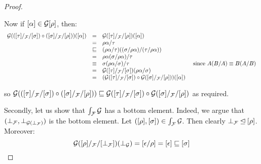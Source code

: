 \begin{proof}
\begin{enumerate}
\[  \]
  Now if ${[\alpha]} \in \mathcal{G}{{[\rho]}}$, then:
  \[
    \begin{array}{rcll}
    \mathcal{G}(({[\tau]}/_{\mathcal{F}}/{[\sigma]}) \circ ({[\sigma]}/_{\mathcal{F}}/{[\rho]}))({[\alpha]})
    & = & \mathcal{G}({[\tau]}/_{\mathcal{F}}/{[\rho]})({[\alpha]}) \\
    & = & \rho\alpha/\tau \\
    & \sqsubseteq & (\rho\alpha/\tau)((\sigma/\rho\alpha)/(\tau/\rho\alpha)) \\
    & = & \rho\alpha(\sigma/\rho\alpha)/\tau \\
    & \equiv & \sigma(\rho\alpha/\sigma)/\tau & \text{ since $A(B/A) \equiv B(A/B)$} \\
    & = & \mathcal{G}({[\tau]}/_{\mathcal{F}}/{[\sigma]})(\rho\alpha/\sigma) \\
    & = & (\mathcal{G}({[\tau]}/_{\mathcal{F}}/{[\sigma]}) \circ \mathcal{G}({[\sigma]}/_{\mathcal{F}}/{[\rho]}))({[\alpha]})
    \end{array}
  \]
\end{enumerate}
so
$\mathcal{G}(({[\tau]}/_{\mathcal{F}}/{[\sigma]}) \circ ({[\sigma]}/_{\mathcal{F}}/{[\rho]}))
\sqsubseteq
\mathcal{G}({[\tau]}/_{\mathcal{F}}/{[\sigma]}) \circ \mathcal{G}({[\sigma]}/_{\mathcal{F}}/{[\rho]})$
as required.

Secondly, let us show that $\int_{\mathcal{F}}{\mathcal{G}}$ has a bottom element.
Indeed, we argue that $(\bot_{\mathcal{F}},\bot_{\mathcal{G}(\bot_{\mathcal{F}})})$ is the bottom
element. Let $({[\rho]},{[\sigma]}) \in \int_{\mathcal{F}}{\mathcal{G}}$.
Then clearly $\bot_{\mathcal{F}} \unlhd {[\rho]}$. Moreover:
\[
 \mathcal{G}([\rho]/_{\mathcal{F}}/[\bot_{\mathcal{F}}])(\bot_{\mathcal{G}}) =
 [\epsilon/\rho] = [\epsilon] \sqsubseteq {[\sigma]}
\]


\end{proof}
